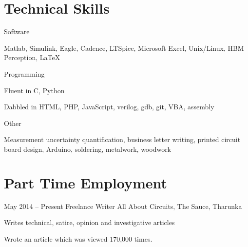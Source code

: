 \documentclass[a4paper]{friggeri-cv} %
\newcommand\shortdot[1]{
\vspace{-\parsep}
\vspace{-1em}
\begin{itemize*}
#1
\end{itemize*} 
}
\begin{document}







\section{Technical Skills}






\entry
{}
{Software}
{}
{
\shortdot{
   \item Matlab, Simulink, Eagle, Cadence, LTSpice, Microsoft Excel, Unix/Linux, HBM Perception, \LaTeX{}
}}



\entry
{}
{Programming}
{}
{
\shortdot{
   \item Fluent in C, Python
   \item Dabbled in HTML, PHP, JavaScript, verilog, gdb, git, VBA, assembly
}
}



\entry
{}
{Other}
{}
{
\shortdot{
   \item Measurement uncertainty quantification, business letter writing, printed circuit board design, Arduino, soldering, metalwork, woodwork
}
}






\section{Part Time Employment}




\entry
{May 2014 -- Present}
{Freelance Writer}
{All About Circuits, The Sauce, Tharunka}
{
\shortdot{
   \item Writes technical, satire, opinion and investigative articles
   \item Wrote an article which was viewed 170,000 times. %
}
}
\end{document}
